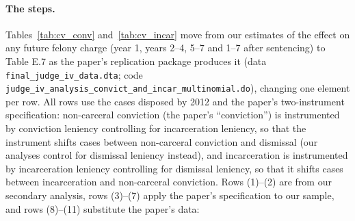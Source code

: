 \documentclass[11pt]{article}
\begin{document}
\paragraph{The steps.} Tables~\ref{tab:cv_conv} and~\ref{tab:cv_incar} move from our estimates of the effect on any future felony charge (year 1, years 2--4, 5--7 and 1--7 after sentencing) to Table E.7 as the paper's replication package produces it (data \texttt{final\_judge\_iv\_data.dta}; code \texttt{judge\_iv\_analysis\_\allowbreak convict\_and\_\allowbreak incar\_\allowbreak multinomial.do}), changing one element per row. All rows use the cases disposed by 2012 and the paper's two-instrument specification: non-carceral conviction (the paper's ``conviction'') is instrumented by conviction leniency controlling for incarceration leniency, so that the instrument shifts cases between non-carceral conviction and dismissal (our analyses control for dismissal leniency instead), and incarceration is instrumented by incarceration leniency controlling for dismissal leniency, so that it shifts cases between incarceration and non-carceral conviction. Rows (1)--(2) are from our secondary analysis, rows (3)--(7) apply the paper's specification to our sample, and rows (8)--(11) substitute the paper's data:
\end{document}
